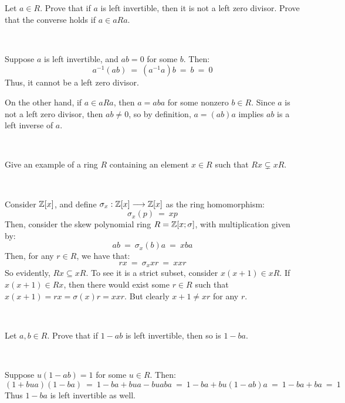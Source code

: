 \begin{exr}[title=Exercise 1.4*]
	Let $a\in R$.
	Prove that if $a$ is left invertible, then it is not a left zero divisor.
	Prove that the converse holds if $a\in aRa$.
\end{exr} \

\begin{pf}
	Suppose $a$ is left invertible, and $ab=0$ for some $b$. Then:
	\begin{equation*}
		a^{-1}(ab) \ = \ (a^{-1}a)b \ = \ b \ = \ 0
	\end{equation*}
	Thus, it cannot be a left zero divisor.

	On the other hand, if $a\in aRa$, then $a=aba$ for some nonzero $b\in R$.
	Since $a$ is not a left zero divisor, then $ab\neq0$, so by definition,
	$a=(ab)a$ implies $ab$ is a left inverse of $a$.
\end{pf} \

\begin{exr}[title=Exercise 1.5]
	Give an example of a ring $R$ containing an element $x\in R$ such that
	$Rx\subsetneq xR$.
\end{exr} \

\begin{pf}
	Consider $\mathbb{Z}[x]$, and define $\sigma_{x}:\mathbb{Z}[x]\longrightarrow\mathbb{Z}[x]$ as the ring homomorphism:
	\begin{equation*}
		\sigma_{x}(p) \ = \ xp
	\end{equation*}
	Then, consider the skew polynomial ring $R=\mathbb{Z}[x;\sigma]$, with
	multiplication given by:
	\begin{equation*}
		ab \ = \ \sigma_{x}(b)a \ = \ xba
	\end{equation*}
	Then, for any $r\in R$, we have that:
	\begin{equation*}
		rx \ = \ \sigma_{x}xr \ = \ xxr
	\end{equation*}
	So evidently, $Rx\subseteq xR$.
	To see it is a strict subset, consider $x(x+1)\in xR$.
	If $x(x+1)\in Rx$, then there would exist some $r\in R$ such that
	$x(x+1) = rx = \sigma(x)r = xxr$.
	But clearly $x+1\neq xr$ for any $r$.
\end{pf} \

\begin{exr}[title=Exercise 1.6]
	Let $a,b\in R$.
	Prove that if $1-ab$ is left invertible, then so is $1-ba$.
\end{exr} \

\begin{pf}
	Suppose $u(1-ab)=1$ for some $u\in R$. Then:
	\begin{equation*}
		(1+bua)(1-ba)
		\ = \ 1-ba+bua-buaba
		\ = \ 1-ba+bu(1-ab)a
		\ = \ 1-ba+ba
		\ = \ 1
	\end{equation*}
	Thus $1-ba$ is left invertible as well.
\end{pf}


